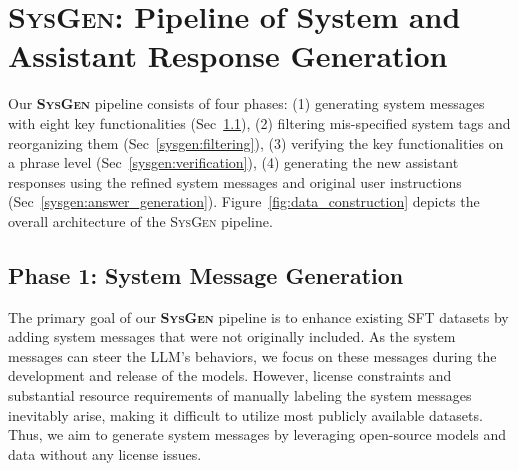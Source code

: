 \section{\textsc{SysGen}: Pipeline of System and Assistant Response Generation}
Our \textbf{\textsc{SysGen}} pipeline consists of four phases: (1) generating system messages with eight key functionalities (Sec~\ref{sysgen:system_generation}), (2) filtering mis-specified system tags and reorganizing them (Sec~\ref{sysgen:filtering}), (3) verifying the key functionalities on a phrase level (Sec~\ref{sysgen:verification}), (4) generating the new assistant responses using the refined system messages and original user instructions (Sec~\ref{sysgen:answer_generation}).
Figure~\ref{fig:data_construction} depicts the overall architecture of the \textsc{SysGen} pipeline. 

\subsection{Phase 1: System Message Generation}
\label{sysgen:system_generation}
The primary goal of our \textbf{\textsc{SysGen}} pipeline is to enhance existing SFT datasets by adding system messages that were not originally included.
As the system messages can steer the LLM's behaviors, we focus on these messages during the development and release of the models.
However, license constraints and substantial resource requirements of manually labeling the system messages inevitably arise, making it difficult to utilize most publicly available datasets.
Thus, we aim to generate system messages by leveraging open-source models and data without any license issues.

